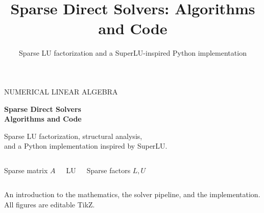 \documentclass[aspectratio=169,10pt]{beamer}
\title{Sparse Direct Solvers: Algorithms and Code}
\subtitle{Sparse LU factorization and a SuperLU-inspired Python implementation}
\begin{document}
\begin{frame}[plain]
\vspace{.2cm}
{\color{Teal}\large NUMERICAL LINEAR ALGEBRA}\par\vspace{.25cm}
{\fontsize{27}{31}\selectfont\bfseries Sparse Direct Solvers\\Algorithms and Code}\par
\vspace{.25cm}
{\large Sparse LU factorization, structural analysis,\\and a Python implementation inspired by SuperLU.}
\vspace{.5cm}
\begin{columns}[c,onlytextwidth]
\centering
\par\small Sparse matrix $A$
\centering
{}\par\small LU
\centering
\par\small Sparse factors $L,U$
\end{columns}
\vfill\scriptsize\color{Slate}An introduction to the mathematics, the solver pipeline, and the implementation. All figures are editable TikZ.
\end{frame}
\end{document}
